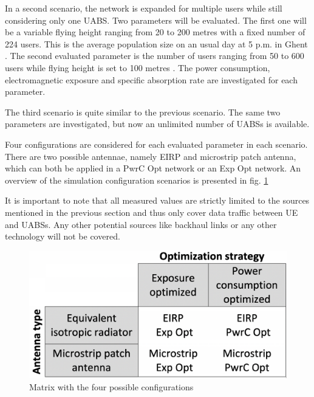 \documentclass[twocolumn]{phdsymp} %
\begin{document}
In a second scenario, the network is expanded for multiple users while still considering only one \gls{UABS}. 
Two parameters will be evaluated. The first one will be a variable flying height ranging from 
20 to 200 metres with a fixed
number of 224 users. This is the average population size on an usual day at 5 p.m. in Ghent \cite{J2}.
The second evaluated parameter is the number of users ranging from 50 to 600 users
while flying height is set to 100 metres \cite{J2}.
The power consumption, electromagnetic exposure and specific 
absorption rate are investigated for each parameter.

The third scenario is quite similar to the previous scenario. The same two parameters
 are investigated, but now an unlimited number of \gls{UABS}s is available.

Four configurations are considered for each evaluated parameter in each scenario.
There are two possible antennae, namely EIRP 
and microstrip patch antenna, which can both be applied in a \gls{PwrC Opt} network or an \gls{Exp Opt} network.
An overview of the simulation configuration scenarios is presented in fig. \ref{fig:fourCasesMatrix}

It is important to note that 
all measured values are strictly limited to the sources mentioned in the previous section and thus only cover data traffic 
between \gls{UE} and \gls{UABS}s. Any other potential sources like backhaul links or any other technology will not be covered.

\begin{figure}[h!]
\centering
  \includegraphics[width=0.7\linewidth]{fourCasesMatrix.png}
  \caption{Matrix with the four possible configurations}
  \label{fig:fourCasesMatrix}
\end{figure}

\end{document}
